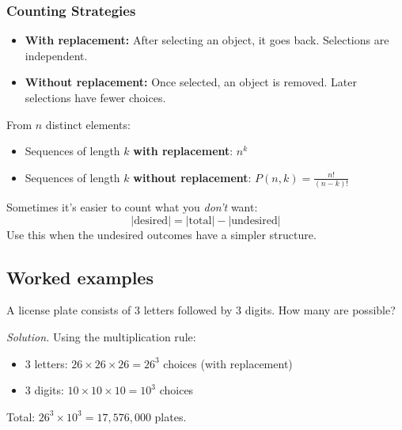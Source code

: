 \subsubsection*{Counting Strategies}

\begin{definition}
\begin{itemize}
  \item \textbf{With replacement:} After selecting an object, it goes back. Selections are independent.
  \item \textbf{Without replacement:} Once selected, an object is removed. Later selections have fewer choices.
\end{itemize}
\end{definition}

\begin{proposition}
From $n$ distinct elements:
\begin{itemize}
  \item Sequences of length $k$ \textbf{with replacement}: $n^k$
  \item Sequences of length $k$ \textbf{without replacement}: $P(n,k) = \frac{n!}{(n-k)!}$
\end{itemize}
\end{proposition}

\begin{strategy}
Sometimes it's easier to count what you \emph{don't} want:
\[
|\text{desired}| = |\text{total}| - |\text{undesired}|
\]
Use this when the undesired outcomes have a simpler structure.
\end{strategy}

\subsection*{Worked examples}

\begin{example}
A license plate consists of 3 letters followed by 3 digits. How many are possible?

\emph{Solution.} Using the multiplication rule:
\begin{itemize}
  \item 3 letters: $26 \times 26 \times 26 = 26^3$ choices (with replacement)
  \item 3 digits: $10 \times 10 \times 10 = 10^3$ choices
\end{itemize}
Total: $26^3 \times 10^3 = 17,576,000$ plates.
\end{example}

